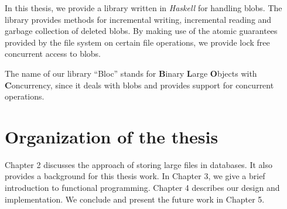 In this thesis, we provide a library written in \textit{Haskell} for handling blobs. The library provides methods for incremental writing, incremental reading and garbage collection of deleted blobs. By making use of the atomic guarantees provided by the file system on certain file operations, we provide lock free concurrent access to blobs.

The name of our library ``Bloc'' stands for \textbf{B}inary \textbf{L}arge \textbf{O}bjects with \textbf{C}oncurrency, since it deals with blobs and provides support for concurrent operations.

\section{Organization of the thesis}
Chapter 2 discusses the approach of storing large files in databases. It also provides a background for this thesis work. In Chapter 3, we give a brief introduction to functional programming. Chapter 4 describes our design and implementation. We conclude and present the future work in Chapter 5.
